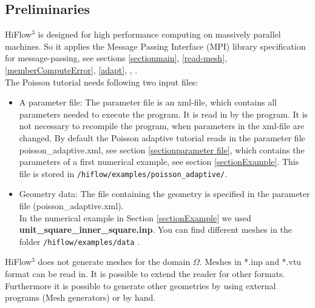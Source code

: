 \documentclass[a4paper, 11pt, twoside]{article}
\begin{document}
\subsection{Preliminaries}
HiFlow$^3$ is designed for high performance computing on massively parallel machines. 
So it applies the Message Passing Interface (MPI) library specification for message-passing, see sections \ref{sectionmain}, \ref{read-mesh}, 
\ref{memberComputeError}, \ref{adapt}, \cite{MPI}, \cite{MPIstandard} .\\
The Poisson tutorial needs following two input files:
\begin{itemize}
\item A parameter file: The parameter file is an xml-file, which contains all parameters needed to execute the program. It is read in by the program. 
It is not necessary to recompile the program, when parameters in the xml-file are changed. By default the Poisson adaptive tutorial reads in the parameter file poisson\_adaptive.xml, 
see section \ref{sectionparameter file}, which contains the parameters of a first numerical example, see section \ref{sectionExample}.
This file is stored in \verb'/hiflow/examples/poisson_adaptive/'.  
\item Geometry data: The file containing the geometry is specified in the parameter file (poisson\_adaptive.xml). \\
In the numerical example in Section \ref{sectionExample} we used \textbf{unit\_square\_inner\_square.inp}. 
You can find different meshes in the folder \verb'/hiflow/examples/data' .
\end{itemize}

HiFlow$^3$ does not generate meshes for the domain $\Omega$. Meshes in *.inp and *.vtu format can be read in. 
It is possible to extend the reader for other formats.
Furthermore it is possible to generate other geometries by using external programs (Mesh generators) or by hand.\\  
\end{document}
